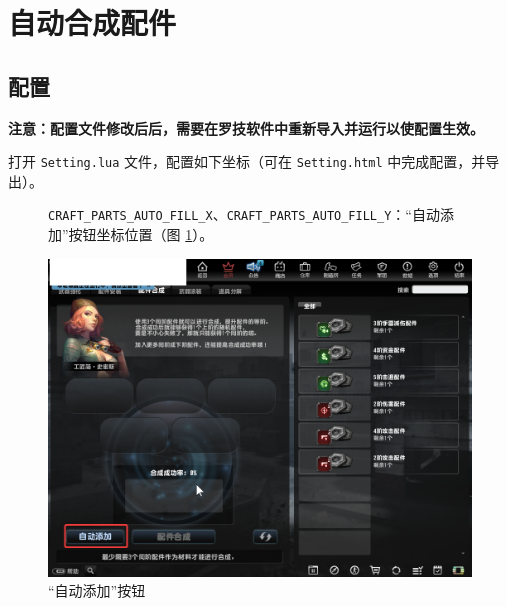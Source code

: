 \section{自动合成配件}

\subsection{配置}

\textbf{\color{red}注意：配置文件修改后后，需要在罗技软件中重新导入并运行以使配置生效。}

打开 \lstinline{Setting.lua} 文件，配置如下坐标（可在 \lstinline{Setting.html} 中完成配置，并导出）。

\begin{figure}[H]
    \Centering
    \parbox[l]{\textwidth}{\lstinline{CRAFT_PARTS_AUTO_FILL_X}、\lstinline{CRAFT_PARTS_AUTO_FILL_Y}：“自动添加”按钮坐标位置（图 \ref{ch3fig-auto-fill}）。}
    \includegraphics[width=\textwidth]{docs/assets/auto_fill.png}
    \caption{“自动添加”按钮}
    \label{ch3fig-auto-fill}
\end{figure}
\clearpage

